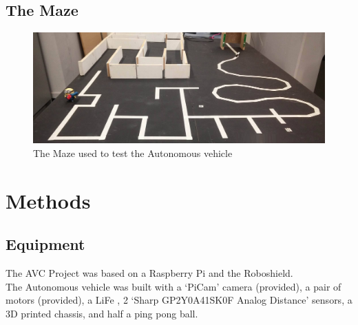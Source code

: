 \documentclass[paper=a4, fontsize=11pt]{scrartcl} %
\numberwithin{equation}{section} %
\numberwithin{figure}{section} %
\begin{document}
\subsection{The Maze}
\begin{figure}[h]
  \includegraphics[width=\textwidth]{maze}
  \centering
  \caption{The Maze used to test the Autonomous vehicle}
\end{figure}
\section{Methods}
\subsection{Equipment}
The AVC Project was based on a Raspberry Pi and the Roboshield.\\
The Autonomous vehicle was built with a `PiCam' camera (provided), a pair of
motors (provided), a LiFe , 2 `Sharp GP2Y0A41SK0F Analog Distance' sensors, a 3D printed
chassis, and half a ping pong ball.
\end{document}

